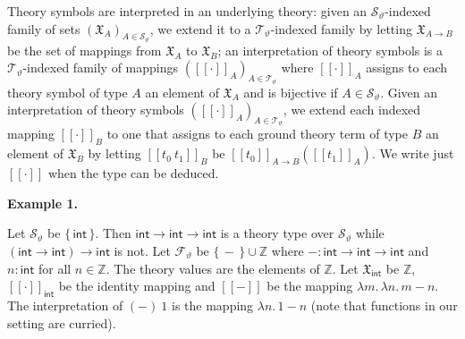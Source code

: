 Theory symbols are interpreted in an underlying theory: given an ${\mathcal{S}}_{\vartheta}$-indexed family of sets $(\mathfrak{X}_{A})_{A\in{\mathcal{S}}_{\vartheta}}$, we extend it to a ${\mathcal{T}}_{\vartheta}$-indexed family by letting $\mathfrak{X}_{A\rightarrow B}$ be the set of mappings from $\mathfrak{X}_{A}$ to $\mathfrak{X}_{B}$; an interpretation of theory symbols is a ${\mathcal{T}}_{\vartheta}$-indexed family of mappings $([\![\cdot]\!]_{A})_{A\in{\mathcal{T}}_{\vartheta}}$ where $[\![\cdot]\!]_{A}$ assigns to each theory symbol of type $A$ an element of $\mathfrak{X}_{A}$ and is bijective if $A\in{\mathcal{S}}_{\vartheta}$. Given an interpretation of theory symbols $([\![\cdot]\!]_{A})_{A\in{\mathcal{T}}_{\vartheta}}$, we extend each indexed mapping $[\![\cdot]\!]_{B}$ to one that assigns to each ground theory term of type $B$ an element of $\mathfrak{X}_{B}$ by letting $[\![{t_{0}}\ {t_{1}}]\!]_{B}$ be $[\![t_{0}]\!]_{A\rightarrow B}([\![t_{1}]\!]_{A})$. We write just $[\![\cdot]\!]$ when the type can be deduced.\par
 
 
 
\par\medskip\noindent\textbf{Example 1.}\par
 
 
Let ${\mathcal{S}}_{\vartheta}$ be $\{\,\mathsf{int}\,\}$. Then $\mathsf{int}\rightarrow\mathsf{int}\rightarrow\mathsf{int}$ is a theory type over ${\mathcal{S}}_{\vartheta}$ while $(\mathsf{int}\rightarrow\mathsf{int})\rightarrow\mathsf{int}$ is not. Let ${\mathcal{F}}_{\vartheta}$ be $\{\,-\,\}\cup\mathbb{Z}$ where ${-}:\mathsf{int}\rightarrow\mathsf{int}\rightarrow\mathsf{int}$ and $n:\mathsf{int}$ for all $n\in\mathbb{Z}$. The theory values are the elements of $\mathbb{Z}$. Let $\mathfrak{X}_{\mathsf{int}}$ be $\mathbb{Z}$, $[\![\cdot]\!]_{\mathsf{int}}$ be the identity mapping and $[\![-]\!]$ be the mapping $\lambda{m}.\,\lambda{n}.\,m-n$. The interpretation of ${(-)}\ {1}$ is the mapping $\lambda{n}.\,1-n$ (note that functions in our setting are curried).\par
 
 
 
 
